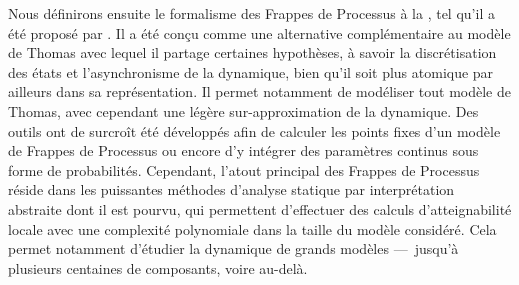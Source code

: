 Nous définirons ensuite le formalisme des Frappes de Processus
à la , tel qu'il a été proposé par .
Il a été conçu comme une alternative complémentaire au modèle de Thomas
avec lequel il partage certaines hypothèses, à savoir la discrétisation des états
et l'asynchronisme de la dynamique,
bien qu'il soit plus atomique par ailleurs dans sa représentation.
Il permet notamment de modéliser tout modèle de Thomas,
avec cependant une légère sur-approximation de la dynamique.
Des outils ont de surcroît été développés afin de calculer les points fixes d'un modèle de
Frappes de Processus ou encore d'y intégrer des paramètres continus
sous forme de probabilités.
Cependant, l'atout principal des Frappes de Processus réside dans les puissantes
méthodes d'analyse statique par interprétation abstraite dont il est pourvu,
qui permettent d'effectuer des calculs d'atteignabilité locale
avec une complexité polynomiale dans la taille du modèle considéré.
Cela permet notamment d'étudier la dynamique de grands modèles
---~jusqu'à plusieurs centaines de composants, voire au-delà.







